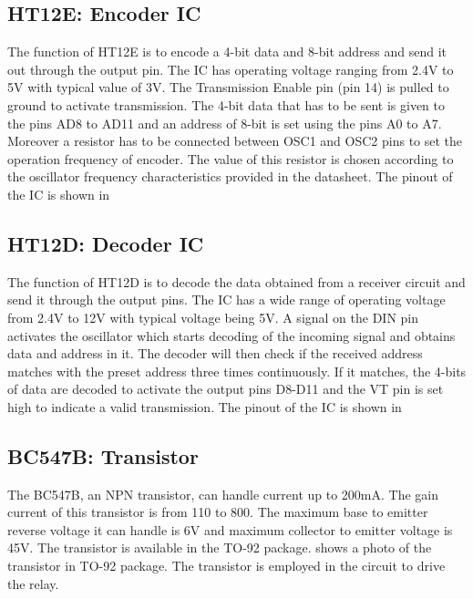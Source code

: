\subsection{HT12E: Encoder IC}

The function of HT12E is to encode a 4-bit data and 8-bit address and send it out through the output pin. The IC has operating voltage ranging from 2.4V to 5V with typical value of 3V. The Transmission Enable pin (pin 14) is pulled to ground to activate transmission. The 4-bit data that has to be sent is given to the pins AD8 to AD11 and an address of 8-bit is set using the pins A0 to A7.  Moreover a resistor has to be connected between OSC1 and OSC2 pins to set the operation frequency of encoder. The value of this resistor is chosen according to the oscillator frequency characteristics provided in the datasheet\cite{ht12e}. The pinout of the IC is shown in 

\vspace{12pt}


\subsection{HT12D: Decoder IC}

The function of HT12D is to decode the data obtained from a receiver circuit and send it through the output pins. The IC has a wide range of operating voltage from 2.4V to 12V with typical voltage being 5V. A signal on the DIN pin activates the oscillator which starts decoding of the incoming signal and obtains data and address in it. The decoder will then check if the received address matches with the preset address three times continuously. If it matches, the 4-bits of data are decoded to activate the output pins D8-D11 and the VT pin is set high to indicate a valid transmission\cite{ht12d}. The pinout of the IC is shown in 

\vspace{12pt}

\subsection{BC547B: Transistor}

The BC547B, an NPN transistor, can handle current up to 200mA. The gain current of this transistor is from 110 to 800. The maximum base to emitter reverse voltage it can handle is 6V and maximum collector to emitter voltage is 45V. The transistor is available in the TO-92 package\cite{bc547}.  shows a photo of the transistor in TO-92 package. The transistor is employed in the circuit to drive the relay. \\

